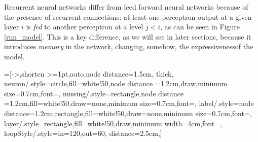 Recurrent neural networks differ from feed forward neural networks because of the presence of recurrent connections: at least one perceptron output at a given layer $i$ is \textit{fed} to another perceptron
at a level $j<i$, as can be seen in Figure \ref{rnn_model}. 
This is a key difference, as we will see in later sections, because it introduces \textit{memory} in the network, changing, somehow, the expressivenessof the model.


=[->,shorten >=1pt,auto,node distance=1.5cm,
  thick,
  neuron/.style={circle,fill=white!50,node distance =1.2cm,draw,minimum size=0.7cm,font=\sffamily\Large\bfseries},
  missing/.style={rectangle,node distance =1.2cm,fill=white!50,draw=none,minimum size=0.7cm,font=\sffamily\Huge\bfseries},
  label/.style={node distance=1.2cm,rectangle,fill=white!50,draw=none,minimum size=0.7cm,font=\sffamily\normalsize},
  layer/.style={rectangle,fill=white!50,draw,minimum width=4cm,font=\sffamily\normalsize},
  loopStyle/.style={in=120,out=60, distance=2.5cm},]
